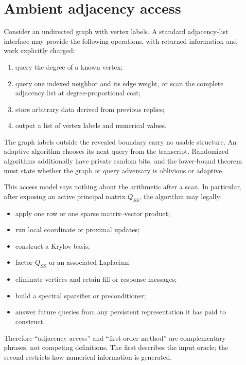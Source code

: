 \section{Ambient adjacency access}
\label{sec:adjacency}

Consider an undirected graph with vertex labels.  A standard adjacency-list
interface may provide the following operations, with returned information and
work explicitly charged:

\begin{enumerate}[label=(\roman*)]
\item query the degree of a known vertex;
\item query one indexed neighbor and its edge weight, or scan the complete
      adjacency list at degree-proportional cost;
\item store arbitrary data derived from previous replies;
\item output a list of vertex labels and numerical values.
\end{enumerate}

The graph labels outside the revealed boundary carry no usable structure.  An
adaptive algorithm chooses its next query from the transcript.  Randomized
algorithms additionally have private random bits, and the lower-bound theorem
must state whether the graph or query adversary is oblivious or adaptive.

This access model says nothing about the arithmetic after a scan.  In
particular, after exposing an active principal matrix $Q_{SS}$, the algorithm
may legally:

\begin{itemize}
\item apply one row or one sparse matrix--vector product;
\item run local coordinate or proximal updates;
\item construct a Krylov basis;
\item factor $Q_{SS}$ or an associated Laplacian;
\item eliminate vertices and retain fill or response messages;
\item build a spectral sparsifier or preconditioner;
\item answer future queries from any persistent representation it has paid to
      construct.
\end{itemize}

Therefore ``adjacency access'' and ``first-order method'' are complementary
phrases, not competing definitions.  The first describes the input oracle; the
second restricts how numerical information is generated.
